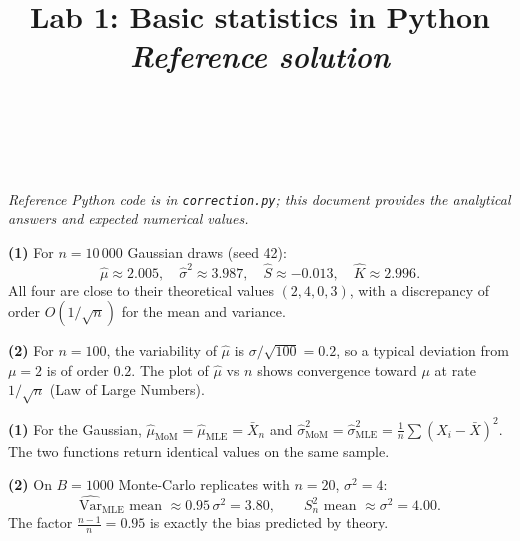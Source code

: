 \documentclass[a4paper,11pt]{article}
\title{Lab 1: Basic statistics in Python\\
\large \emph{Reference solution}}
\author{\auteurNom\\\auteurEmail\\\auteurInstitution}
\date{\anneeUniversitaire}
\begin{document}
\maketitle

\noindent\emph{Reference Python code is in \texttt{correction.py}; this
document provides the analytical answers and expected numerical values.}

\setcounter{excounter}{0}
\begin{exercise}\end{exercise}

\begin{solution}
\textbf{(1)} For $n = 10\,000$ Gaussian draws (seed 42):
\[
  \widehat\mu \approx 2.005, \quad
  \widehat\sigma^2 \approx 3.987, \quad
  \widehat S \approx -0.013, \quad
  \widehat K \approx 2.996.
\]
All four are close to their theoretical values $(2, 4, 0, 3)$, with a
discrepancy of order $O(1/\sqrt{n})$ for the mean and variance.

\textbf{(2)} For $n = 100$, the variability of $\widehat\mu$ is
$\sigma / \sqrt{100} = 0.2$, so a typical deviation from $\mu = 2$ is
of order $0.2$. The plot of $\widehat\mu$ vs $n$ shows convergence
toward $\mu$ at rate $1/\sqrt{n}$ (Law of Large Numbers).
\end{solution}

\begin{exercise}\end{exercise}

\begin{solution}
\textbf{(1)} For the Gaussian, $\widehat\mu_{\text{MoM}} = \widehat\mu_{\text{MLE}}
= \bar X_n$ and $\widehat\sigma^2_{\text{MoM}} = \widehat\sigma^2_{\text{MLE}}
= \tfrac{1}{n}\sum(X_i - \bar X)^2$. The two functions return identical
values on the same sample.

\textbf{(2)} On $B = 1000$ Monte-Carlo replicates with $n = 20$,
$\sigma^2 = 4$:
\[
  \widehat{\mathrm{Var}}_{\text{MLE}}\text{ mean } \approx 0.95\, \sigma^2
  = 3.80,
  \qquad
  S^2_n\text{ mean } \approx \sigma^2 = 4.00.
\]
The factor $\tfrac{n - 1}{n} = 0.95$ is exactly the bias predicted by
theory.
\end{solution}

\begin{exercise}\end{exercise}
\end{document}
